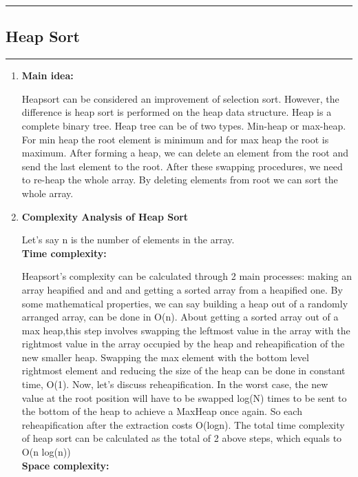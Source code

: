 \documentclass[11pt,a4paper]{article}
\begin{document}
{		\rule{15cm}{0.1cm}
		\subsection{Heap Sort}
		\rule{15cm}{0.1cm}
			\begin{enumerate}[label=\textbf{\arabic*})]
				\item \textbf{Main idea:}
				
					Heapsort can be considered an improvement of selection sort. However, the difference is heap sort is performed on the heap data structure. Heap is a complete binary tree. Heap tree can be of two types. Min-heap or max-heap. For min heap the root element is minimum and for max heap the root is maximum. After forming a heap, we can delete an element from the root and send the last element to the root. After these swapping procedures, we need to re-heap the whole array. By deleting elements from root we can sort the whole array.
				\\[12pt]
				\item \textbf{Complexity Analysis of Heap Sort}
					
					Let’s say n is the number of elements in the array. 
					\\[9pt]
					\textbf{Time complexity:}
					
					Heapsort’s complexity can be calculated through 2 main processes: making an array heapified and and and getting a sorted array from a heapified one.
					By some mathematical properties, we can say building a heap out of a randomly arranged array, can be done in O(n).
					About getting a sorted array out of a max heap,this step involves swapping the leftmost value in the array with the rightmost value in the array occupied by the heap and reheapification of the new smaller heap. Swapping the max element with the bottom level rightmost element and reducing the size of the heap can be done in constant time, O(1). Now, let’s discuss reheapification. In the worst case, the new value at the root position will have to be swapped log(N) times to be sent to the bottom of the heap to achieve a MaxHeap once again. So each reheapification after the extraction costs O(logn).
					The total time complexity of heap sort can be calculated as the total of 2 above steps, which equals to O(n log(n))
					\\[9pt]
					\textbf{Space complexity:}
					

\end{enumerate}}
\end{document}
